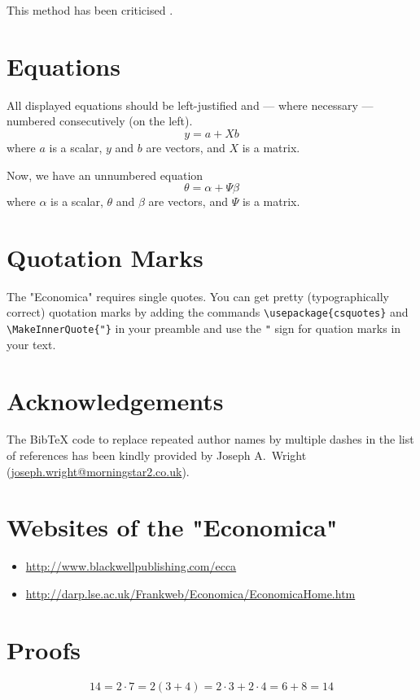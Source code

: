 \documentclass[endfloat]{ecca}
\begin{document}
This method has been criticised \citep{jones99a, jones99, brown00a}.


\section{Equations}
All displayed equations should be left-justified
and --- where necessary --- numbered consecutively (on the left).
\begin{equation}
y = a + X b
\end{equation}
where $a$ is a scalar,
$y$ and $b$ are vectors,
and $X$ is a matrix.

Now, we have an unnumbered equation
\begin{equation*}
\theta = \alpha + \Psi \beta
\end{equation*}
where $\alpha$ is a scalar,
$\theta$ and $\beta$ are vectors,
and $\Psi$ is a matrix.


\section{Quotation Marks}
The "Economica" requires single quotes.
You can get pretty (typographically correct) quotation marks
by adding the commands
\verb!\usepackage{csquotes}!
and
\verb!\MakeInnerQuote{"}!
in your preamble and use the \verb!"! sign for quation marks in your text.


\section*{Acknowledgements}

The Bib\TeX{} code to replace repeated author names by multiple dashes
in the list of references has been kindly provided by
Joseph A.\ Wright (\url{joseph.wright@morningstar2.co.uk}).


\listofendnotes

\appendix

\section{Websites of the "Economica"}
\begin{itemize}
\item \url{http://www.blackwellpublishing.com/ecca}
\item \url{http://darp.lse.ac.uk/Frankweb/Economica/EconomicaHome.htm}
\end{itemize}

\section{Proofs}
\begin{equation*}
14 = 2 \cdot 7  = 2 ( 3 + 4 ) = 2 \cdot 3 + 2 \cdot 4 = 6 + 8 = 14
\end{equation*}


\nocite{*}



\end{document}
